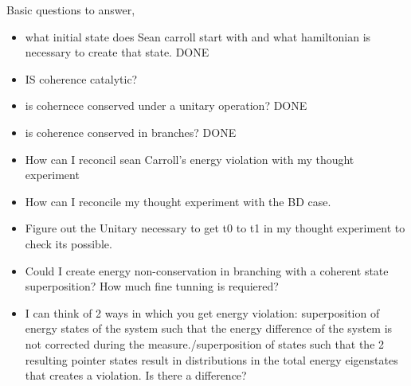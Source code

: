 \documentclass{article}
\begin{document}
Basic questions to answer,
\begin{itemize}
    \item what initial state does Sean carroll start with and what hamiltonian is necessary to create that state. DONE
    \item IS coherence catalytic? 
    \item is cohernece conserved under a unitary operation? DONE
    \item is coherence conserved in branches? DONE
    \item How can I reconcil sean Carroll's energy violation with my thought experiment 
    \item How can I reconcile my thought experiment with the BD case.
    \item Figure out the Unitary necessary to get t0 to t1 in my thought experiment to check its possible.
    \item Could I create energy non-conservation in branching with a coherent state superposition? How much fine tunning is requiered?
    \item I can think of 2 ways in which you get energy violation: superposition of energy states of the system such that the energy difference of the system is not corrected during the measure./superposition of states such that the 2 resulting pointer states result in distributions in the total energy eigenstates that creates a violation. Is there a difference?
\end{itemize}
\end{document}
